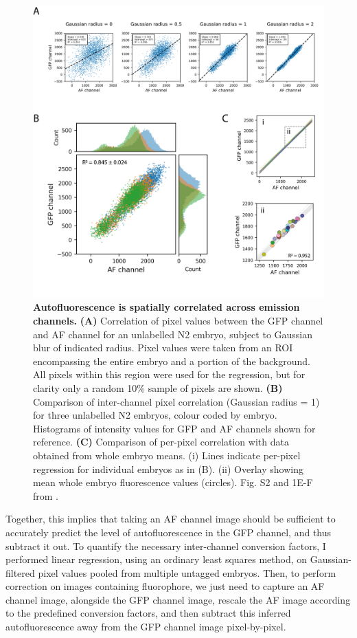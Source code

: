 \documentclass[12pt]{"article"}
\newcommand{\mycaption}[2]{\caption[#1]{\textbf{#1.} #2}}
\begin{document}
\begin{figure}
\includegraphics[scale=0.95]{saibr_n2_correlation}
\centering
\mycaption{Autofluorescence is spatially correlated across emission channels}{
\textbf{(A)} Correlation of pixel values between the GFP channel and AF channel for an unlabelled N2 embryo, subject to Gaussian blur of indicated radius. Pixel values were taken from an ROI encompassing the entire embryo and a portion of the background. All pixels within this region were used for the regression, but for clarity only a random 10\% sample of pixels are shown.
\textbf{(B)} Comparison of inter-channel pixel correlation (Gaussian radius = 1) for three unlabelled N2 embryos, colour coded by embryo. Histograms of intensity values for GFP and AF channels shown for reference.
\textbf{(C)} Comparison of per-pixel correlation with data obtained from whole embryo means. (i) Lines indicate per-pixel regression for individual embryos as in (B). (ii) Overlay showing mean whole embryo fluorescence values (circles).
Fig. S2 and 1E-F from \textcite{Rodrigues2022}.
}
\label{fig:saibr_n2_correlation}
\end{figure}

Together, this implies that taking an AF channel image should be sufficient to accurately predict the level of autofluorescence in the GFP channel, and thus subtract it out. To quantify the necessary inter-channel conversion factors, I performed linear regression, using an ordinary least squares method, on Gaussian-filtered pixel values pooled from multiple untagged embryos. Then, to perform correction on images containing fluorophore, we just need to capture an AF channel image, alongside the GFP channel image, rescale the AF image according to the predefined conversion factors, and then subtract this inferred autofluorescence away from the GFP channel image pixel-by-pixel.\\
\end{document}
